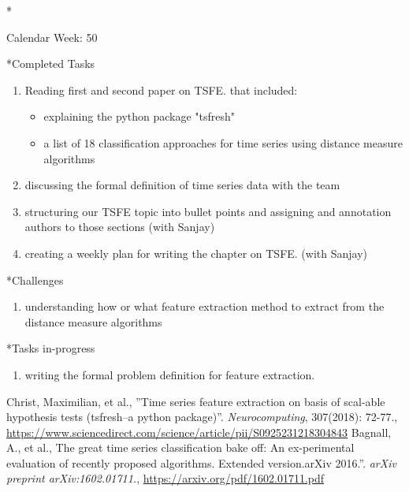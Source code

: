 \documentclass[11pt,a4paper]{article}
\begin{document}
\newpage
\begin{section}*{Calendar Week: 50 \hfill \date{11 December, 2020}}
	
	\begin{subsection}*{Completed Tasks}
		\begin{enumerate}
			\item Reading first \cite{paper1} and second paper \cite{paper2} on TSFE. that included:
			\begin{itemize}
				\item explaining the python package "tsfresh"
				\item a list of 18 classification approaches for time series using distance measure algorithms
			\end{itemize}
			\item discussing the formal definition of time series data with the team
			\item structuring our TSFE topic into bullet points and assigning and annotation authors to those sections (with Sanjay)
			\item creating a weekly plan for writing the chapter on TSFE. (with Sanjay)
		\end{enumerate}
	\end{subsection}
	
	\begin{subsection}*{Challenges}
		\begin{enumerate}
			\item understanding how or what feature extraction method to extract from the distance measure algorithms
		\end{enumerate}
	\end{subsection}
	
	\begin{subsection}*{Tasks in-progress}
		\begin{enumerate}
			\item writing the formal problem definition for feature extraction.
		\end{enumerate}
	\end{subsection}
	
	\begin{thebibliography}{9}
		{Christ, Maximilian, et al.},
		”Time series feature extraction on basis of scal-able  hypothesis  tests  (tsfresh–a  python  package)”. \textit{Neurocomputing},  
		307(2018): 72-77.,
		\href{https://www.sciencedirect.com/science/article/pii/S0925231218304843}{https://www.sciencedirect.com/science/article/pii/S0925231218304843}
		{Bagnall, A., et al.},
		The great time series classification bake off:  An ex-perimental evaluation of recently proposed algorithms.  Extended version.arXiv 2016.”.
		\textit{arXiv preprint arXiv:1602.01711.},
		\href{https://arxiv.org/pdf/1602.01711.pdf}{https://arxiv.org/pdf/1602.01711.pdf}
	\end{thebibliography}
\end{section}
\end{document}
